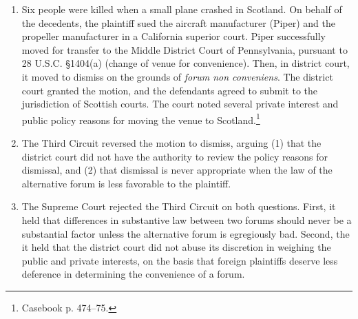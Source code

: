 \begin{enumerate}
    \item Six people were killed when a small plane crashed in Scotland. On behalf of the decedents, the plaintiff sued the aircraft manufacturer (Piper) and the propeller manufacturer in a California superior court. Piper successfully moved for transfer to the Middle District Court of Pennsylvania, pursuant to 28 U.S.C. §1404(a) (change of venue for convenience). Then, in district court, it moved to dismiss on the grounds of \emph{forum non conveniens}. The district court granted the motion, and the defendants agreed to submit to the jurisdiction of Scottish courts. The court noted several private interest and public policy reasons for moving the venue to Scotland.\footnote{Casebook p. 474--75. }
    \item The Third Circuit reversed the motion to dismiss, arguing (1) that the district court did not have the authority to review the policy reasons for dismissal, and (2) that dismissal is never appropriate when the law of the alternative forum is less favorable to the plaintiff.
    \item The Supreme Court rejected the Third Circuit on both questions. First, it held that differences in substantive law between two forums should never be a substantial factor unless the alternative forum is egregiously bad. Second, the it held that the district court did not abuse its discretion in weighing the public and private interests, on the basis that foreign plaintiffs deserve less deference in determining the convenience of a forum.
\end{enumerate}
